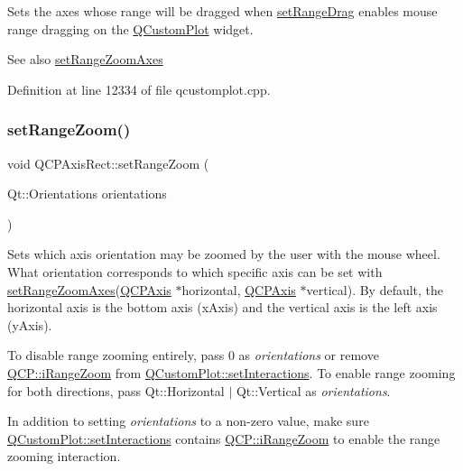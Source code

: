Sets the axes whose range will be dragged when \hyperlink{class_q_c_p_axis_rect_ae6aef2f7211ba6097c925dcd26008418}{set\+Range\+Drag} enables mouse range dragging on the \hyperlink{class_q_custom_plot}{Q\+Custom\+Plot} widget.

\begin{DoxySeeAlso}{See also}
\hyperlink{class_q_c_p_axis_rect_a9442cca2aa358405f39a64d51eca13d2}{set\+Range\+Zoom\+Axes} 
\end{DoxySeeAlso}


Definition at line 12334 of file qcustomplot.\+cpp.

\mbox{\label{class_q_c_p_axis_rect_a7960a9d222f1c31d558b064b60f86a31}} 
\subsubsection{\texorpdfstring{set\+Range\+Zoom()}{setRangeZoom()}}
{\footnotesize\ttfamily void Q\+C\+P\+Axis\+Rect\+::set\+Range\+Zoom (\begin{DoxyParamCaption}\item[{Qt\+::\+Orientations}]{orientations }\end{DoxyParamCaption})}

Sets which axis orientation may be zoomed by the user with the mouse wheel. What orientation corresponds to which specific axis can be set with \hyperlink{class_q_c_p_axis_rect_a9442cca2aa358405f39a64d51eca13d2}{set\+Range\+Zoom\+Axes}(\hyperlink{class_q_c_p_axis}{Q\+C\+P\+Axis} $\ast$horizontal, \hyperlink{class_q_c_p_axis}{Q\+C\+P\+Axis} $\ast$vertical). By default, the horizontal axis is the bottom axis (x\+Axis) and the vertical axis is the left axis (y\+Axis).

To disable range zooming entirely, pass 0 as {\itshape orientations} or remove \hyperlink{namespace_q_c_p_a2ad6bb6281c7c2d593d4277b44c2b037abee1e94353525a636aeaf0ba32b72e14}{Q\+C\+P\+::i\+Range\+Zoom} from \hyperlink{class_q_custom_plot_a5ee1e2f6ae27419deca53e75907c27e5}{Q\+Custom\+Plot\+::set\+Interactions}. To enable range zooming for both directions, pass {\ttfamily Qt\+::\+Horizontal $\vert$ Qt\+::\+Vertical} as {\itshape orientations}.

In addition to setting {\itshape orientations} to a non-\/zero value, make sure \hyperlink{class_q_custom_plot_a5ee1e2f6ae27419deca53e75907c27e5}{Q\+Custom\+Plot\+::set\+Interactions} contains \hyperlink{namespace_q_c_p_a2ad6bb6281c7c2d593d4277b44c2b037abee1e94353525a636aeaf0ba32b72e14}{Q\+C\+P\+::i\+Range\+Zoom} to enable the range zooming interaction.

